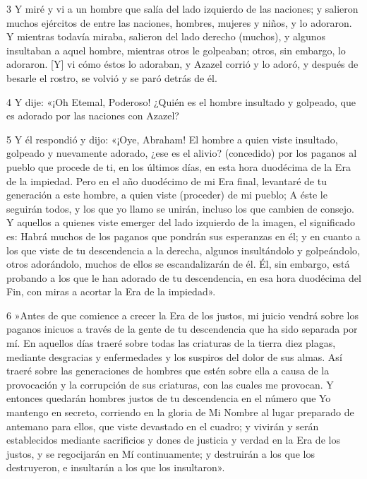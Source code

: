\par 3 Y miré y vi a un hombre que salía del lado izquierdo de las naciones; y salieron muchos ejércitos de entre las naciones, hombres, mujeres y niños, y lo adoraron. Y mientras todavía miraba, salieron del lado derecho (muchos), y algunos insultaban a aquel hombre, mientras otros le golpeaban; otros, sin embargo, lo adoraron. [Y] vi cómo éstos lo adoraban, y Azazel corrió y lo adoró, y después de besarle el rostro, se volvió y se paró detrás de él.

\par 4 Y dije: «¡Oh Etemal, Poderoso! ¿Quién es el hombre insultado y golpeado, que es adorado por las naciones con Azazel?

\par 5 Y él respondió y dijo: «¡Oye, Abraham! El hombre a quien viste insultado, golpeado y nuevamente adorado, ¿ese es el alivio? (concedido) por los paganos al pueblo que procede de ti, en los últimos días, en esta hora duodécima de la Era de la impiedad. Pero en el año duodécimo de mi Era final, levantaré de tu generación a este hombre, a quien viste (proceder) de mi pueblo; A éste le seguirán todos, y los que yo llamo se unirán, incluso los que cambien de consejo. Y aquellos a quienes viste emerger del lado izquierdo de la imagen, el significado es: Habrá muchos de los paganos que pondrán sus esperanzas en él; y en cuanto a los que viste de tu descendencia a la derecha, algunos insultándolo y golpeándolo, otros adorándolo, muchos de ellos se escandalizarán de él. Él, sin embargo, está probando a los que le han adorado de tu descendencia, en esa hora duodécima del Fin, con miras a acortar la Era de la impiedad».

\par 6 »Antes de que comience a crecer la Era de los justos, mi juicio vendrá sobre los paganos inicuos a través de la gente de tu descendencia que ha sido separada por mí. En aquellos días traeré sobre todas las criaturas de la tierra diez plagas, mediante desgracias y enfermedades y los suspiros del dolor de sus almas. Así traeré sobre las generaciones de hombres que estén sobre ella a causa de la provocación y la corrupción de sus criaturas, con las cuales me provocan. Y entonces quedarán hombres justos de tu descendencia en el número que Yo mantengo en secreto, corriendo en la gloria de Mi Nombre al lugar preparado de antemano para ellos, que viste devastado en el cuadro; y vivirán y serán establecidos mediante sacrificios y dones de justicia y verdad en la Era de los justos, y se regocijarán en Mí continuamente; y destruirán a los que los destruyeron, e insultarán a los que los insultaron».


